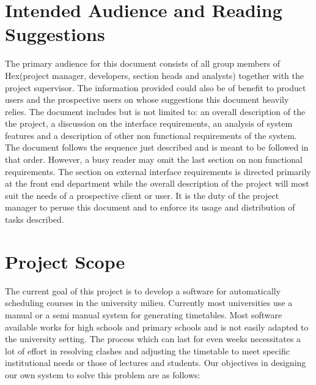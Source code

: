 \documentclass{scrreprt}
\begin{document}
\section{Intended Audience and Reading Suggestions}
 The primary audience for this document consists of all group members of Hex(project manager, developers, section heads and analysts) together with the project supervisor. The information provided could also be of benefit to product users and the prospective users on whose suggestions this document heavily relies. The document includes but is not limited to: an overall description of the the project, a discussion on the interface requirements, an analysis of system features and a description of other non functional requirements of the system. The document follows the sequence just described and is meant to be followed in that order. However, a busy reader may omit the last section on non functional requirements. The section on external interface requirements is directed primarily at the front end department while the overall description of the project will most suit the needs of a prospective client or user. It is the duty of the project manager to peruse this document and to enforce its usage and distribution of tasks described.

\begin{comment}
$<$Describe the different types of reader that the document is intended for, 
such as developers, project managers, marketing staff, users, testers, and 
documentation writers. Describe what the rest of this SRS contains and how it is 
organized. Suggest a sequence for reading the document, beginning with the 
overview sections and proceeding through the sections that are most pertinent to 
each reader type.$>$
\end{comment}

\section{Project Scope}
 The  current goal of this project is to develop a software for automatically scheduling courses in the university milieu. Currently most universities use a manual or a semi manual system for generating timetables. Most software available works for high schools and primary schools and is not easily adapted to the university setting. The process which can last for even weeks necessitates a lot of effort in resolving clashes and adjusting the timetable to meet specific institutional needs or those of lectures and students. Our objectives in designing our own system to solve this problem are as follows:
\end{document}
